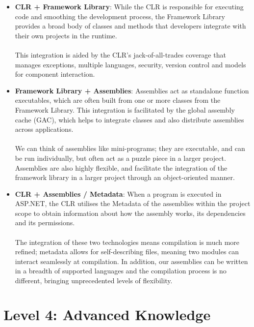 \documentclass[a4paper, 11pt]{report}
\begin{document}
    \begin{itemize}
        \item \textbf{CLR + Framework Library}: While the CLR is responsible for executing code and smoothing the development process, the Framework Library provides a broad body of classes and methods that developers integrate with their own projects in the runtime.
        \\
        \\This integration is aided by the CLR's jack-of-all-trades coverage that manages exceptions, multiple languages, security, version control and models for component interaction.

        \item \textbf{Framework Library + Assemblies}: Assemblies act as standalone function executables, which are often built from one or more classes from the Framework Library. This integration is facilitated by the global assembly cache (GAC), which helps to integrate classes and also distribute assemblies across applications.
        \\
        \\We can think of assemblies like mini-programs; they are executable, and can be run individually, but often act as a puzzle piece in a larger project. Assemblies are also highly flexible, and facilitate the integration of the framework library in a larger project through an object-oriented manner.

        \item \textbf{CLR + Assemblies / Metadata}: When a program is executed in ASP.NET, the CLR utilises the Metadata of the assemblies within the project scope to obtain information about how the assembly works, its dependencies and its permissions.
        \\
        \\The integration of these two technologies means compilation is much more refined; metadata allows for self-describing files, meaning two modules can interact seamlessly at compilation. In addition, our assemblies can be written in a breadth of supported languages and the compilation process is no different, bringing unprecedented levels of flexibility.

    \end{itemize}




	\newpage
	\section{Level 4: Advanced Knowledge}
\end{document}
